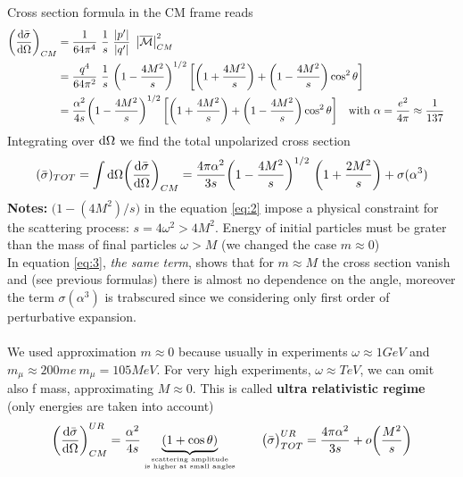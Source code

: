 \documentclass[TheoreticalPhy_ModB.tex]{subfiles}
\begin{document}
Cross section formula in the CM frame reads
\begin{align}
\biggl( \frac{\textup{d} \bar{\sigma}}{\textup{d} \Omega} \biggr)_{CM}
	& = \frac{1}{64\pi^4} \ \frac{1}{s} \ \frac{\left\lvert p' \right\rvert}{\left\lvert q' \right\rvert} \ \left\lvert \overline{\mathcal{M}} \right\rvert^2_{CM} \notag \\
	& = \frac{q^4}{64 \pi^2} \ \frac{1}{s} \ \biggl( 1 - \frac{4M^2}{s} \biggr)^{1/2} \, 
		\biggl[ \biggl( 1 + \frac{4M^2}{s} \biggr) + \biggl( 1 - \frac{4M^2}{s} \biggr) \cos^2 \theta \biggr] \notag \\
	& = \frac{\alpha^2}{4s} \biggl( 1 - \frac{4M^2}{s} \biggr)^{1/2} \,
		\biggl[ \biggl( 1 + \frac{4M^2}{s} \biggr) + \biggl( 1 - \frac{4M^2}{s} \biggr) \cos^2 \theta \biggr]
		\quad \textup{with } \alpha = \frac{e^2}{4 \pi} \approx \frac{1}{137}	
		\label{eq:2}&
\end{align}
Integrating over $\textup{d} \Omega$ we find the total unpolarized cross section
\begin{equation}
(\bar{\sigma})_{TOT} = \int \de \Omega \biggl( \frac{\de \bar{\sigma}}{\de \Omega} \biggr)_{CM}
= \frac{4 \pi \alpha^2}{3s} \biggl( 1 - \frac{4M^2}{s} \biggr)^{1/2} \ \biggl( 1 + \frac{2M^2}{s} \biggr) + \sigma(\alpha^3)
\label{eq:3}
\end{equation}
\textbf{Notes: } $\bigl( 1 - (4M^2)/s \bigr)$ in the equation \ref{eq:2} impose a physical constraint for the scattering process: $s = 4\omega^2 > 4M^2$.
Energy of initial particles must be grater than the mass of final particles $\omega > M$ (we changed the case $m \approx 0$)\\
In equation \ref{eq:3}, \emph{the same term}, shows that for $m \approx M$ the cross section vanish and (see previous formulas) there is almost no dependence on the angle, moreover the term $\sigma(\alpha^3)$ is trabscured since we considering only first order of perturbative expansion.\\ \\
We used approximation $m \approx 0$ because usually in experiments $\omega \approx 1 GeV$ and $m_{\mu} \approx 200 me \ m_{\mu} = 105 MeV$. For very high experiments, $\omega \approx TeV$, we can omit also f mass, approximating $M \approx 0$. This is called \textbf{ultra relativistic regime} (only energies are taken into account)
\[
\biggl( \frac{\textup{d} \bar{\sigma}}{\textup{d} \Omega} \biggr)_{CM}^{UR} =
	\frac{\alpha^2}{4s} \underbrace{(1 + \cos \theta)}_{\text{scattering amplitude} \atop \text{is higher at small angles}}
\qquad
\bigl( \bar{\sigma} \bigr)^{UR}_{TOT} = \frac{4 \pi \alpha^2}{3s} + o \biggl( \frac{M^2}{s} \biggr)
\]
\end{document}
